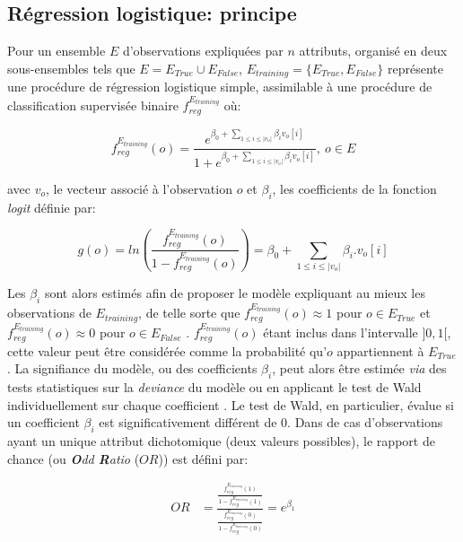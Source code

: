 \subsection{Régression logistique: principe}\label{parregresslog}
	Pour un ensemble $E$ d'observations expliquées par $n$ attributs, organisé en deux sous-ensembles tels que $E=E_{True}\cup E_{False}$, $E_{training}=\{E_{True},E_{False}\}$ représente une procédure de régression logistique simple, assimilable à une procédure de classification supervisée binaire $f_{reg}^{E_{training}}$ où:

	\begin{equation}\label{eqlogreg}
		f_{reg}^{E_{training}}(o)=\frac{e^{\beta_{0}+\sum_{1\leq i \leq |v_{o}|}\beta_{i} v_{o}[i]}}{1+e^{\beta_{0}+\sum_{1\leq i \leq |v_{o}|}\beta_{i} v_{o}[i]}}, \: o \in E
	\end{equation}

avec $v_{o}$, le vecteur associé à l'observation $o$ et $\beta_{i}$, les coefficients de la fonction \textit{logit} définie par:

	\begin{equation}
		g(o)=ln\left(\frac{f_{reg}^{E_{training}}(o)}{1-f_{reg}^{E_{training}}(o)}\right)=\beta_{0}+\sum_{1\leq i \leq |v_{o}|}\beta_{i}.v_{o}[i] 
	\end{equation}

Les $\beta_{i}$ sont alors estimés afin de proposer le modèle expliquant au mieux les observations de $E_{training}$, de telle sorte que $f_{reg}^{E_{training}}(o)\approx 1$ pour $o \in E_{True}$ et $f_{reg}^{E_{training}}(o)\approx 0$ pour $o \in E_{False}$ \citep{hosmer2013applied}. $f_{reg}^{E_{training}}(o)$ étant inclus dans l'intervalle $]0,1[$, cette valeur peut être considérée comme la probabilité qu'$o$ appartiennent à $E_{True}$ \citep{Larose2006}. La signifiance du modèle, ou des coefficients $\beta_{i}$, peut alors être estimée \textit{via} des tests statistiques sur la \textit{deviance} du modèle ou en applicant le test de Wald individuellement sur chaque coefficient \citep{Larose2006}. Le test de Wald, en particulier, évalue si un coefficient $\beta_{i}$ est significativement différent de $0$. Dans de cas d'observations ayant un unique attribut dichotomique (deux valeurs possibles), le rapport de chance (ou \textit{\textbf{O}dd \textbf{R}atio} ($OR$)) \citep{Larose2006} est défini par:

	\begin{equation}
		\begin{split}
		OR & =\frac{\frac{f_{reg}^{E_{training}}(1)}{1-f_{reg}^{E_{training}}(1)}}{\frac{f_{reg}^{E_{training}}(0)}{1-f_{reg}^{E_{training}}(0)}}=e^{\beta_{1}} \\
		\end{split}
	\end{equation}


